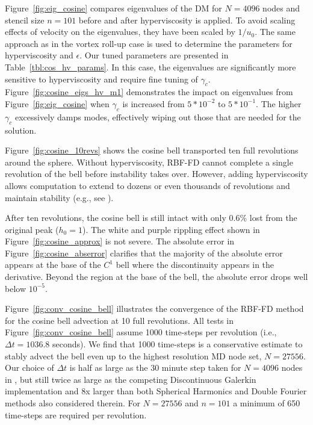 \documentclass{report}
\begin{document}
Figure~\ref{fig:eig_cosine} compares eigenvalues of the DM for $N=4096$ nodes and stencil size $n=101$ before and after hyperviscosity is applied. To avoid scaling effects of velocity on the eigenvalues, they have been scaled by $1/u_0$.  The same approach as in the vortex roll-up case is used to determine the parameters for hyperviscosity and $\epsilon$. Our tuned parameters are presented in 
Table~\ref{tbl:cos_hv_params}. In this case, the eigenvalues are significantly more sensitive to hyperviscosity and require fine tuning of $\gamma_c$. Figure~\ref{fig:cosine_eigs_hv_m1} demonstrates the impact on eigenvalues from Figure~\ref{fig:eig_cosine} when $\gamma_c$ is increased from $5*10^{-2}$ to $5*10^{-1}$. The higher $\gamma_c$ excessively damps modes, effectively wiping out those that are needed for the solution. 


Figure~\ref{fig:cosine_10revs} shows the cosine bell transported ten full revolutions around the sphere. Without hyperviscosity, RBF-FD cannot complete a single revolution of the bell before instability takes over. However, adding hyperviscosity allows computation to extend to dozens or even thousands of revolutions and maintain stability (e.g., see \cite{FornbergLehto11}). 

After ten revolutions, the cosine bell is still intact with only 0.6\% lost from the original peak ($h_0=1$). The white and purple rippling effect shown in Figure~\ref{fig:cosine_approx} is not severe. The absolute error in Figure~\ref{fig:cosine_abserror} clarifies that the majority of the absolute error appears at the base of the $C^1$ bell where the discontinuity appears in the derivative. Beyond the region at the base of the bell, the absolute error drops well below $10^{-5}$. 

Figure~\ref{fig:conv_cosine_bell} illustrates the convergence of the RBF-FD method for the cosine bell advection at 10 full revolutions. All tests in Figure~\ref{fig:conv_cosine_bell} assume 1000 time-steps per revolution (i.e., $\Delta t = 1036.8$ seconds). We find that 1000 time-steps is a conservative estimate to stably advect the bell even up to the highest resolution MD node set, $N=27556$. Our choice of $\Delta t$ is half as large as the 30 minute step taken for $N=4096$ nodes in \cite{FlyerWright07}, but still twice as large as the competing Discontinuous Galerkin implementation and 8x larger than both Spherical Harmonics and Double Fourier methods also considered therein. For $N=27556$ and $n=101$ a minimum of 650 time-steps are required per revolution. 
\end{document}
